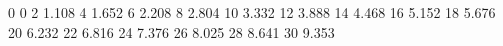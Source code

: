 0 0
2  1.108
4  1.652
6  2.208
8  2.804
10 3.332
12 3.888
14 4.468
16 5.152
18 5.676
20 6.232
22 6.816
24 7.376
26 8.025
28 8.641
30 9.353
